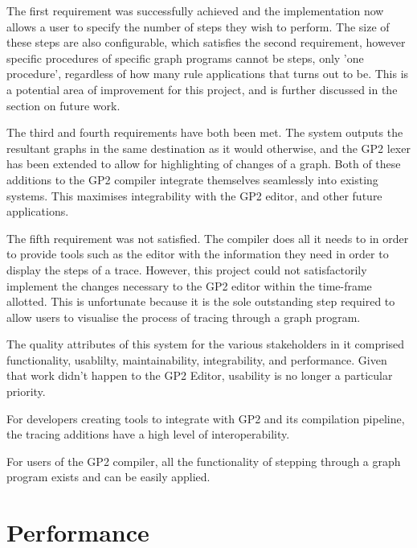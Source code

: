 \documentclass{UoYCSproject}
\begin{document}
The first requirement was successfully achieved and the implementation now allows a user to specify the number of steps they wish to perform. The size of these steps are also configurable, which satisfies the second requirement, however specific procedures of specific graph programs cannot be steps, only 'one procedure', regardless of how many rule applications that turns out to be. This is a potential area of improvement for this project, and is further discussed in the section on future work. 

The third and fourth requirements have both been met. The system outputs the resultant graphs in the same destination as it would otherwise, and the GP2 lexer has been extended to allow for highlighting of changes of a graph. Both of these additions to the GP2 compiler integrate themselves seamlessly into existing systems. This maximises integrability with the GP2 editor, and other future applications.

The fifth requirement was not satisfied. The compiler does all it needs to in order to provide tools such as the editor with the information they need in order to display the steps of a trace. However, this project could not satisfactorily implement the changes necessary to the GP2 editor within the time-frame allotted. This is unfortunate because it is the sole outstanding step required to allow users to visualise the process of tracing through a graph program.

The quality attributes of this system for the various stakeholders in it comprised functionality, usablilty, maintainability, integrability, and performance. Given that work didn't happen to the GP2 Editor, usability is no longer a particular priority.

For developers creating tools to integrate with GP2 and its compilation pipeline, the tracing additions have a high level of interoperability.

For users of the GP2 compiler, all the functionality of stepping through a graph program exists and can be easily applied.

\section{Performance}
\end{document}
